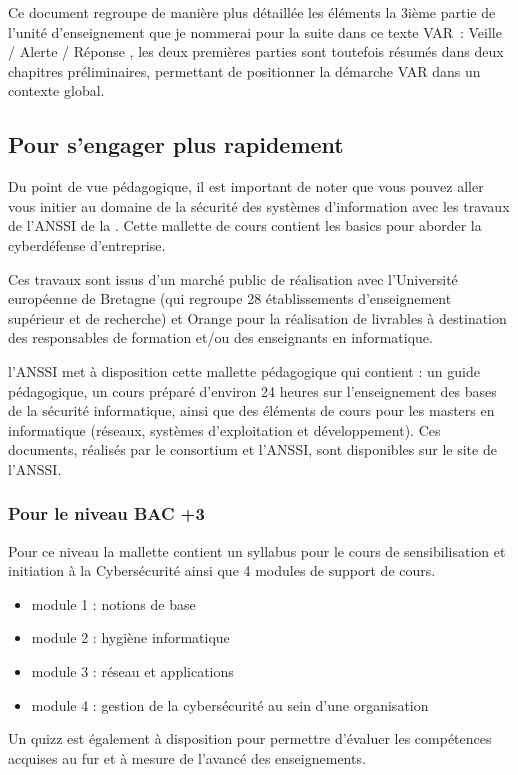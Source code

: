 Ce document regroupe de manière plus détaillée les éléments la 3ième partie de l'unité d'enseignement que je nommerai pour la suite dans ce texte   VAR : Veille / Alerte / Réponse ,  les deux premières parties sont toutefois résumés dans deux chapitres préliminaires, permettant de positionner la démarche VAR dans un contexte global.

\subsection{Pour s'engager plus rapidement}

Du point de vue pédagogique, il est important de noter que vous pouvez aller vous initier au domaine de la sécurité des systèmes d'information avec les travaux de l'ANSSI de la . Cette mallette de cours contient les basics pour aborder la cyberdéfense d'entreprise.

Ces travaux sont issus d'un marché public de réalisation avec l’Université européenne de Bretagne  (qui regroupe 28 établissements d’enseignement supérieur et de recherche) et Orange pour la réalisation de livrables à destination des responsables de formation et/ou des enseignants en informatique.

l’ANSSI met à disposition cette mallette pédagogique qui contient : un guide pédagogique, un cours préparé d’environ 24 heures sur l’enseignement des bases de la sécurité informatique, ainsi que des éléments de cours pour les masters en informatique (réseaux, systèmes d’exploitation et développement).
Ces documents, réalisés par le consortium et l’ANSSI, sont disponibles sur le site de l'ANSSI.
 

\subsubsection {Pour le niveau BAC +3}

Pour ce niveau la mallette contient un syllabus pour le cours de sensibilisation et initiation à la Cybersécurité ainsi que 4 modules de support de cours.

\begin{itemize}
	\item module 1 :  notions de base
	\item module 2  :  hygiène informatique
	\item module 3 :  réseau et applications
	\item module 4 :  gestion de la cybersécurité au sein d’une organisation
\end{itemize}
Un quizz est également à disposition pour permettre d’évaluer les compétences acquises au fur et à mesure de l’avancé des enseignements.

